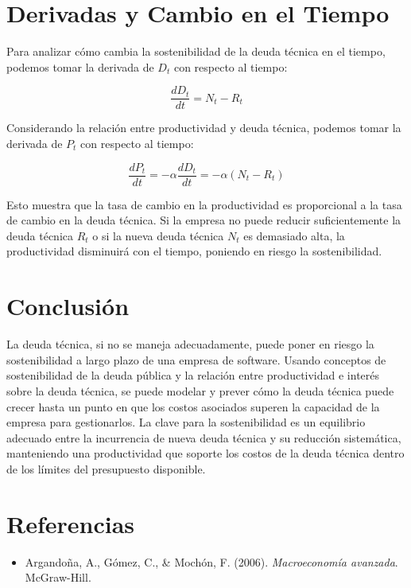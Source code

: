 \documentclass[12pt]{article}
\begin{document}
\section{Derivadas y Cambio en el Tiempo}
Para analizar cómo cambia la sostenibilidad de la deuda técnica en el tiempo, podemos tomar la derivada de \(D_t\) con respecto al tiempo:

\[
\frac{dD_t}{dt} = N_t - R_t
\]

Considerando la relación entre productividad y deuda técnica, podemos tomar la derivada de \(P_t\) con respecto al tiempo:

\[
\frac{dP_t}{dt} = -\alpha \frac{dD_t}{dt} = -\alpha (N_t - R_t)
\]

Esto muestra que la tasa de cambio en la productividad es proporcional a la tasa de cambio en la deuda técnica. Si la empresa no puede reducir suficientemente la deuda técnica \(R_t\) o si la nueva deuda técnica \(N_t\) es demasiado alta, la productividad disminuirá con el tiempo, poniendo en riesgo la sostenibilidad.

\section{Conclusión}

La deuda técnica, si no se maneja adecuadamente, puede poner en riesgo la sostenibilidad a largo plazo de una empresa de software. 
Usando conceptos de sostenibilidad de la deuda pública y la relación entre productividad e interés sobre la deuda técnica, se puede modelar y prever 
cómo la deuda técnica puede crecer hasta un punto en que los costos asociados superen la capacidad de la empresa para gestionarlos. 
La clave para la sostenibilidad es un equilibrio adecuado entre la incurrencia de nueva deuda técnica y su reducción sistemática, manteniendo una productividad 
que soporte los costos de la deuda técnica dentro de los límites del presupuesto disponible.

\section{Referencias}
\begin{itemize}
    \item Argandoña, A., Gómez, C., \& Mochón, F. (2006). \textit{Macroeconomía avanzada}. McGraw-Hill.
\end{itemize}
\end{document}
